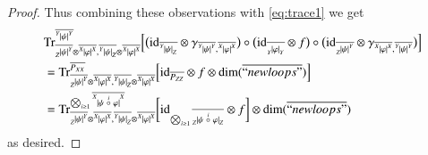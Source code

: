 \documentclass{amsart}
\def\tn{\textnormal}
\def\dim{\tn{dim}}
\def\Trace{\tn{Tr}}
\def\ol{\overline}
\def\id{\tn{id}}
\newcommand{\feeddd}[3]{{\tensor*[^{#2}_{\color{white}{!}}]{{|#1|}}{^{#3}}}}%
\newcommand{\feeddc}[3]{{\tensor*[^{#2}]{{|#1|}}{_{#3}}}}
\newcommand{\feedcd}[3]{{\tensor*[_{#2}]{{|#1|}}{^{#3}}}}
\newcommand{\feedcc}[3]{{\tensor*[^{\color{white}{!}}_{#2}]{{|#1|}}{_{#3}}}}
\theoremstyle{remark}
\theoremstyle{definition}
\begin{document}
\begin{proof}
Thus combining these observations with \eqref{eq:trace1} we get
\begin{align*}
 &\Trace^{\ol{\feeddd{\psi}{Y}{Y}}}_{\ol{\feedcd{\psi}{Z}{Y}}\otimes\ol{\feeddd{\varphi}{X}{X}},\ol{\feeddc{\psi}{Y}{Z}}\otimes\ol{\feeddd{\varphi}{X}{X}}}
\Big[
\big(\id_{\ol{\feeddc{\psi}{Y}{Z}}}\otimes\gamma_{\ol{\feeddd{\psi}{Y}{Y}},\ol{\feeddd{\varphi}{X}{X}}}\big)\circ\big(\id_{\ol{\feedcc{\varphi}{Y}{Y}}}\otimes f\big)\circ\big(\id_{\ol{\feedcd{\psi}{Z}{Y}}}\otimes\gamma_{\ol{\feeddd{\varphi}{X}{X}},\ol{\feeddd{\psi}{Y}{Y}}}\big)
\Big]\\
 &=\Trace^{\ol{P_{XX}}}_{\ol{\feedcd{\psi}{Z}{Y}}\otimes\ol{\feeddd{\varphi}{X}{X}},\ol{\feeddc{\psi}{Y}{Z}}\otimes\ol{\feeddd{\varphi}{X}{X}}}
 \Big[\id_{\ol{P_{ZZ}}}\otimes f\otimes\dim(\ol{``newloops"})\Big]\\
  &=\Trace^{\bigotimes_{i\ge1}\ol{\feeddd{\psi\;\accentset{i}{\circ}\;\varphi}{X}{X}}}_{\ol{\feedcd{\psi}{Z}{Y}}\otimes\ol{\feeddd{\varphi}{X}{X}},\ol{\feeddc{\psi}{Y}{Z}}\otimes\ol{\feeddd{\varphi}{X}{X}}}\bigg[\id_{\bigotimes_{i\ge1}\ol{\feedcc{\psi\;\accentset{i}{\circ}\;\varphi}{Z}{Z}}}\otimes f\bigg]\otimes\dim(\ol{``newloops"})
 \end{align*}
 as desired.
 
 \newpage


\end{proof}
\end{document}
